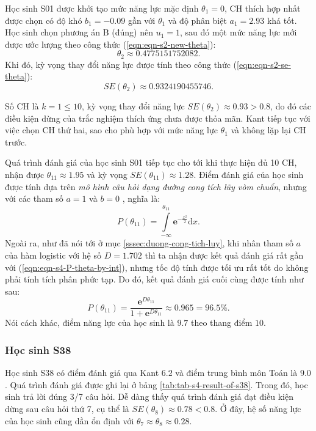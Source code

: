 Học sinh S01 được khởi tạo mức năng lực mặc định $\theta_1=0$, CH thích hợp nhất được chọn có độ khó $b_1=-0.09$ gần với $\theta_1$ và độ phân biệt $a_1=2.93$ khá tốt. Học sinh chọn phương án B (đúng) nên $u_1=1$, sau đó một mức năng lực mới được ước lượng theo công thức (\ref{eqn:eqn-s2-new-theta}): $$\theta_2\approx 0.4775151752082.$$
Khi đó, kỳ vọng thay đổi năng lực được tính theo công thức (\ref{eqn:eqn-s2-se-theta}): $$SE(\theta_2)\approx 0.9324190455746.$$\par
Số CH là $k=1\leqslant 10$, kỳ vọng thay đổi năng lực $SE(\theta_2)\approx 0.93>0.8$, do đó các điều kiện dừng của trắc nghiệm thích ứng chưa được thỏa mãn. Kant tiếp tục với việc chọn CH thứ hai, sao cho phù hợp với mức năng lực $\theta_1$ và không lặp lại CH trước.\par
Quá trình đánh giá của học sinh S01 tiếp tục cho tới khi thực hiện đủ 10 CH, nhận được $\theta_{11}\approx 1.95$ và kỳ vọng $SE(\theta_{11})\approx 1.28$. Điểm đánh giá của học sinh được tính dựa trên \textit{mô hình câu hỏi dạng đường cong tích lũy vòm chuẩn}, nhưng với các tham số $a=1$ và $b=0$ \parencite{le2019phat}, nghĩa là: \begin{equation}\label{eqn:eqn-s4-P-theta-by-int}P(\theta_{11})=\int\limits_{-\infty}^{\theta_{11}}\mathbf{e}^{-\frac{x^2}{2}}\mathrm{d}x.\end{equation}
Ngoài ra, như đã nói tới ở mục \ref{sssec:duong-cong-tich-luy}, khi nhân tham số $a$ của hàm logistic với hệ số $D=1.702$ thì ta nhận được kết quả đánh giá rất gần với (\ref{eqn:eqn-s4-P-theta-by-int}), nhưng tốc độ tính được tối ưu rất tốt do không phải tính tích phân phức tạp. Do đó, kết quả đánh giá cuối cùng được tính như sau: $$P(\theta_{11})=\frac{\mathbf{e}^{D\theta_{11}}}{1+\mathbf{e}^{D\theta_{11}}}\approx 0.965=96.5\%.$$
Nói cách khác, điểm năng lực của học sinh là $9.7$ theo thang điểm $10$.

\subsubsection{Học sinh S38}
Học sinh S38 có điểm đánh giá qua Kant $6.2$ và điểm trung bình môn Toán là $9.0$. Quá trình đánh giá được ghi lại ở bảng \ref{tab:tab-s4-result-of-s38}. Trong đó, học sinh trả lời đúng 3/7 câu hỏi. Dễ dàng thấy quá trình đánh giá đạt điều kiện dừng sau câu hỏi thứ 7, cụ thể là $SE(\theta_8)\approx 0.78<0.8$. Ở đây, hệ số năng lực của học sinh cũng dần ổn định với $\theta_7\approx\theta_8\approx 0.28$.

